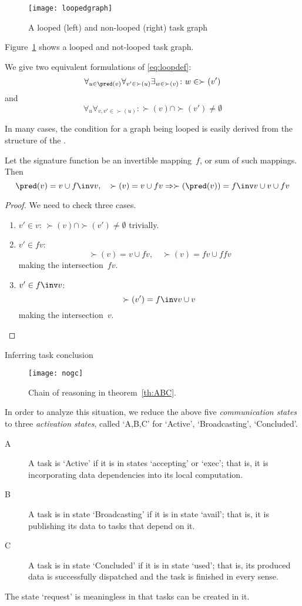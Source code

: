 \begin{figure}[ht]
  \texttt{[image: loopedgraph]}
  \caption{A looped (left) and non-looped (right) task graph}
  \label{fig:loopedgraph}
\end{figure}

Figure~\ref{fig:loopedgraph} shows a looped and not-looped task graph.

We give two equivalent formulations of \eqref{eq:loopdef}:
\[
    \forall_{u\in\pred(v)}\forall_{v'\in\succ(u)}\exists_{w\in\succ(v)}
    \colon w\in\succ(v')
\]
and
\[
    \forall_u\forall_{v,v'\in\succ(u)}
    \colon \succ(v)\cap\succ(v')\not=\emptyset
\]
    
In many cases, the condition for a graph being looped is easily
derived from the structure of the .

\begin{lemma}
  Let the signature function be an invertible mapping~$f$,
  or sum of such mappings.
  Then
  \[ \pred(v)=v\cup f\inv v,\quad \succ(v)=v\cup fv \Rightarrow
  \succ(\pred(v)) = f\inv v\cup v \cup fv
  \]
\end{lemma}

\begin{proof}
  We need to check three cases.
  \begin{enumerate}
  \item $v'\in v$: $\succ(v)\cap \succ(v')\not=\emptyset$ trivially.
  \item $v'\in fv$: \[ \succ(v)=v\cup fv,\quad \succ(v)=fv\cup ffv \]
    making the intersection~$fv$.
  \item $v'\in f\inv v$: \[ \succ(v')=f\inv v\cup v \]
    making the intersection~$v$.
  \end{enumerate}
\end{proof}

\pagebreak
{} {Inferring task conclusion}

\begin{wrapfigure}{r}{2.5in}
  \texttt{[image: nogc]}
  \caption{Chain of reasoning in theorem~\ref{th:ABC}.}
\end{wrapfigure}
%
In order to analyze this situation, we reduce the above five 
\emph{communication states} to
three \emph{activation states},
called `A,B,C' for `Active', `Broadcasting', `Concluded'.
\begin{description}
\item[A] A task is `Active' if it is in states `accepting'
  or `exec'; that is, it is incorporating data dependencies into its
  local computation.
\item[B] A task is in state `Broadcasting' if it is in state `avail';
  that is, it is publishing its data to tasks that depend on it.
\item[C] A task is in state `Concluded' if it is in state `used'; that
  is, its produced data is successfully dispatched and the task is
  finished in every sense.
\end{description}
The state `request' is meaningless in that tasks can be created 
in it.

